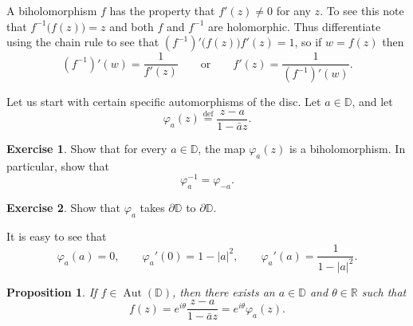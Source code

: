 \documentclass[12pt,openany]{book}
\newcommand{\sabs}[1]{\lvert {#1} \rvert}
\newcommand{\R}{{\mathbb{R}}}
\newcommand{\D}{{\mathbb{D}}}
\theoremstyle{plain}
\newtheorem{prop}[thm]{Proposition}
\theoremstyle{remark}
\theoremstyle{definition}
\newenvironment{exbox}{%
    \def\FrameCommand{\vrule width 1pt \relax\hspace {10pt}}%
    \MakeFramed {\advance \hsize -\width \FrameRestore }%
}{%
    \endMakeFramed
}
\theoremstyle{exercise}
\newtheorem{exercise}{Exercise}[section]
\theoremstyle{example}
\begin{document}
A biholomorphism $f$ has the property that $f'(z) \not= 0$ for any $z$.  To
see this note that $f^{-1}\bigl(f(z)\bigr) = z$ and both $f$ and $f^{-1}$
are holomorphic.  Thus differentiate using the chain rule to see
that $(f^{-1})' \bigl(f(z)\bigr) f'(z) = 1$, so if $w = f(z)$ then
\begin{equation*}
(f^{-1})'(w) = \frac{1}{f'(z)}
\qquad \text{or} \qquad
f'(z) =
\frac{1}{(f^{-1})'(w)} .
\end{equation*}

Let us start with certain specific automorphisms of the disc.  Let $a \in \D$, and let
\begin{equation*}
\varphi_a(z) \overset{\text{def}}{=} \frac{z-a}{1-\bar{a}z}.
\end{equation*}

\begin{exbox}
\begin{exercise}
Show that for every $a \in \D$, the map $\varphi_a(z)$ is a biholomorphism.
In particular, show that
\begin{equation*}
\varphi_a^{-1} = \varphi_{-a} .
\end{equation*}
\end{exercise}

\begin{exercise}
Show that $\varphi_a$ takes $\partial \D$ to $\partial \D$.
\end{exercise}
\end{exbox}

It is easy to see that
\begin{equation*}
\varphi_a(a) = 0, \qquad
\varphi_a'(0) = 1 - \sabs{a}^2, \qquad
\varphi_a'(a) = \frac{1}{1 - \sabs{a}^2} .
\end{equation*}

\begin{prop}
If $f \in \operatorname{Aut}(\D)$, then there exists an $a \in \D$
and $\theta \in \R$ such that
\begin{equation*}
f(z) = e^{i\theta} \frac{z-a}{1-\bar{a}z} = e^{i\theta} \varphi_a(z).
\end{equation*}
\end{prop}
\end{document}
